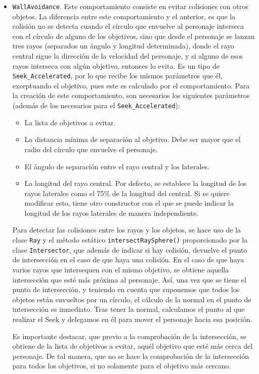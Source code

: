 \begin{itemize}
 \item \texttt{WallAvoidance}. Este comportamiento consiste en evitar colisiones con otros objetos. La diferencia entre este comportamiento y el anterior, es que la colisión no se detecta cuando el círculo que envuelve al personaje interseca con el círculo de alguno de los objetivos, sino que desde el personaje se lanzan tres rayos (separados un ángulo y longitud determinada), donde el rayo central sigue la dirección de la velocidad del personaje, y si alguno de esos rayos interseca con algún objetivo, entonces lo evita. Es un tipo de \texttt{Seek\_Accelerated}, por lo que recibe los mismos parámetros que él, exceptuando el objetivo, pues este es calculado por el comportamiento. Para la creación de este comportamiento, son necesarios los siguientes parámetros (además de los necesarios para el \texttt{Seek\_Accelerated}):
 \begin{itemize}
  \item La lista de objetivos a evitar.
  \item La distancia mínima de separación al objetivo. Debe ser mayor que el radio del círculo que envuelve el personaje.
  \item El ángulo de separación entre el rayo central y los laterales.
  \item La longitud del rayo central. Por defecto, se establece la longitud de los rayos laterales como el 75\% de la longitud del central. Si se quiere modificar esto, tiene otro constructor con el que se puede indicar la longitud de los rayos laterales de manera independiente.
 \end{itemize}
 Para detectar las colisiones entre los rayos y los objetos, se hace uso de la clase \texttt{Ray} y el método estático \texttt{intersectRaySphere()} proporcionado por la clase \texttt{Intersector}, que además de indicar si hay colisión, devuelve el punto de intersección en el caso de que haya una colisión. En el caso de que haya varios rayos que intersequen con el mismo objetivo, se obtiene aquella intersección que esté más próxima al personaje. Así, una vez que se tiene el punto de intersección, y teniendo en cuenta que suponemos que todos los objetos están envueltos por un círculo, el cálculo de la normal en el punto de intersección es inmediato. Tras tener la normal, calculamos el punto al que realizar el Seek y delegamos en él para mover el personaje hacia esa posición.
 
 Es importante destacar, que previo a la comprobación de la intersección, se obtiene de la lista de objetivos a evitar, aquél objetivo que esté más cerca del personaje. De tal manera, que no se hace la comprobación de la intersección para todos los objetivos, si no solamente para el objetivo más cercano. 
 

\end{itemize}
